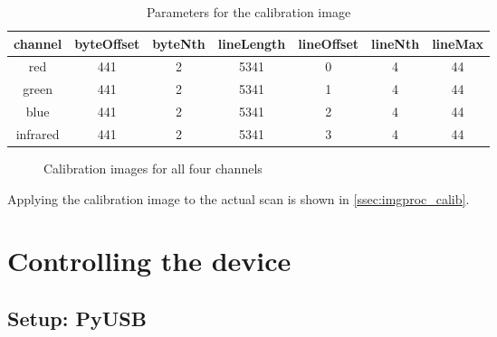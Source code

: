 \documentclass{article}
\begin{document}
\begin{table}[H]
  \caption{Parameters for the calibration image}
  \centering
  \begin{tabular}{c | c | c | c | c | c | c}
    channel & byteOffset & byteNth & lineLength & lineOffset & lineNth & lineMax \\ \hline
    red & 441 & 2 & 5341 & 0 & 4 & 44 \\
    green & 441 & 2 & 5341 & 1 & 4 & 44 \\
    blue & 441 & 2 & 5341 & 2 & 4 & 44 \\
    infrared & 441 & 2 & 5341 & 3 & 4 & 44 \\
  \end{tabular}
\end{table}


\begin{figure}[H]
    \centering
    
    \caption{Calibration images for all four channels}
\end{figure}

Applying the calibration image to the actual scan is shown in \ref{ssec:imgproc_calib}.

\section{Controlling the device}

\subsection{Setup: PyUSB}
\end{document}
